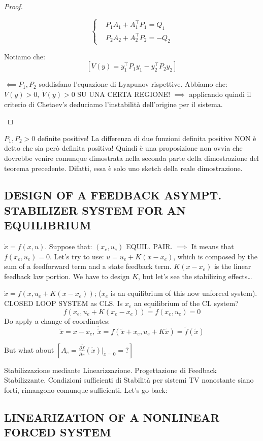 \begin{proof}
\begin{itemize}
\[
	\left\{
	\begin{aligned}
	&P_1A_1 + A_1^\top P_1 = Q_1 \\
	&P_2A_2 + A_2^\top P_2 = -Q_2
	\end{aligned} 
	\right.
\]

Notiamo che:
\[
	[V(y) = y_1^\top P_1y_1 - y_2^\top P_2y_2]
\]

$\impliedby P_1,P_2$ soddisfano l'equazione di Lyapunov rispettive. Abbiamo che: $V(y) > 0,\ \dot{V}(y) > 0$ SU UNA CERTA REGIONE! $\implies$ applicando quindi il criterio di Chetaev's deduciamo l'instabilità dell'origine per il sistema. \QEDA
\end{itemize}
\end{proof}

$P_1,P_2 > 0$ definite positive! La differenza di due funzioni definita positive NON è detto che sia però definita positiva! Quindi è una proposizione non ovvia che dovrebbe venire comunque dimostrata nella seconda parte della dimostrazione del teorema precedente. Difatti, essa è solo uno sketch della reale dimostrazione.

\subsection{DESIGN OF A FEEDBACK ASYMPT. STABILIZER SYSTEM FOR AN EQUILIBRIUM}

$\dot{x}=f(x,u)$. Suppose that: $(x_e,u_e)$ EQUIL. PAIR. $\implies$ It means that $f(x_e,u_e)=0$. Let's try to use: $u = u_e + K(x-x_e)$, which is composed by the sum of a feedforward term and a state feedback term. $K(x-x_e)$ is the linear feedback law portion. We have to design $K$, but let's see the stabilizing effects\dots

$\dot{x}=f(x,u_e+K(x-x_e))$; ($x_e$ is an equilibrium of this now unforced system). CLOSED LOOP SYSTEM as CLS. Is $x_e$ an equilibrium of the CL system?
\[
	f(x_e,u_e+K(x_e-x_e)) = f(x_e,u_e) = 0
\]
Do apply a change of coordinates:
\[
	\tilde{x}=x-x_e,\ \dot{\tilde{x}} = f(\tilde{x}+x_e,u_e+K\tilde{x}) = \tilde{f}(\tilde{x})
\]

But what about $[A_e = \frac{\partial{\tilde{f}}}{\partial{\tilde{x}}}(\tilde{x})|_{\tilde{x}=0} = ?]$

Stabilizzazione mediante Linearizzazione. Progettazione di Feedback Stabilizzante. Condizioni sufficienti di Stabilità per sistemi TV nonostante siano forti, rimangono comunque sufficienti. Let's go back:

\subsection{LINEARIZATION OF A NONLINEAR FORCED SYSTEM}

